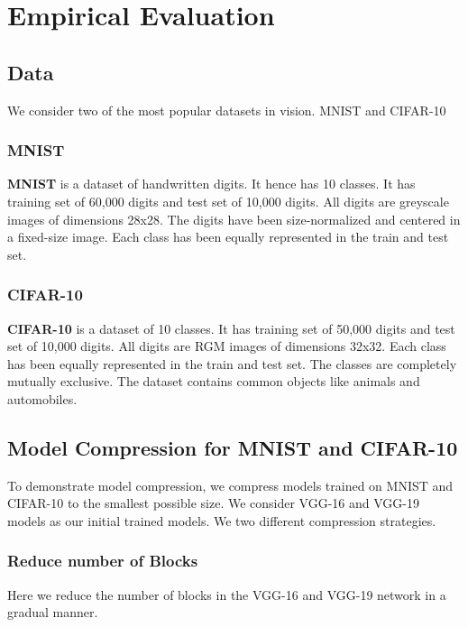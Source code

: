 \documentclass[a4paper,twocolumn]{article}
\begin{document}
\section{Empirical Evaluation}
\label{sec-4}

\subsection{Data}
\label{sec-4-1}

We consider two of the most popular datasets in vision. MNIST and CIFAR-10

\subsubsection*{MNIST}
\label{sec-4-1-1}
\textbf{MNIST}\parencite{mnist} is a dataset of handwritten digits. It hence has 10 classes. It has training set of 60,000 digits and test set of 10,000 digits. All digits are greyscale images of dimensions 28x28. The digits have been size-normalized and centered in a fixed-size image. Each class has been equally represented in the train and test set.

\subsubsection*{CIFAR-10}
\label{sec-4-1-2}
\textbf{CIFAR-10}\parencite{cifar} is a dataset of 10 classes. It has training set of 50,000 digits and test set of 10,000 digits. All digits are RGM images of dimensions 32x32. Each class has been equally represented in the train and test set. The classes are completely mutually exclusive. The dataset contains common objects like animals and automobiles.

\subsection{Model Compression for MNIST and CIFAR-10}
\label{sec-4-2}

To demonstrate model compression, we compress models trained on MNIST and CIFAR-10 to the smallest possible size. We consider VGG-16 and VGG-19 models as our initial trained models. We two different compression strategies.

\subsubsection*{Reduce number of Blocks}
\label{sec-4-2-1}
Here we reduce the number of blocks in the VGG-16 and VGG-19 network in a gradual manner.
\end{document}
